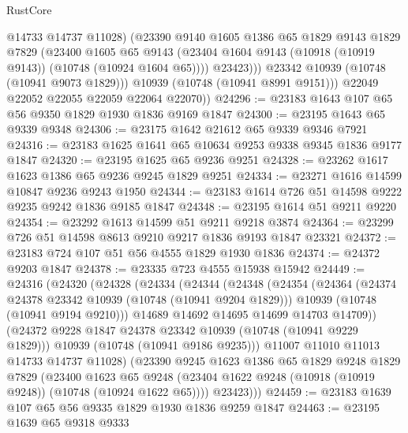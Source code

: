 \begin{lexlean}{RustCore}
\begin{coremodule}
                  @14733
                  @14737
                  @11028)
                (@23390
                  @9140
                  @1605
                  @1386
                  @65
                  @1829
                  @9143
                  @1829
                  @7829
                  (@23400
                    @1605
                    @65
                    @9143
                    (@23404 @1604 @9143 (@10918 (@10919 @9143)) (@10748 (@10924 @1604 @65))))
                  @23423)))
            @23342
            @10939
            (@10748 (@10941 @9073 @1829)))
          @10939
          (@10748 (@10941 @8991 @9151)))
        @22049
        @22052
        @22055
        @22059
        @22064
        @22070))
@24296 := @23183 @1643 @107 @65 @56 @9350 @1829 @1930 @1836 @9169 @1847
@24300 := @23195 @1643 @65 @9339 @9348
@24306 := @23175 @1642 @21612 @65 @9339 @9346 @7921
@24316 := @23183 @1625 @1641 @65 @10634 @9253 @9338 @9345 @1836 @9177 @1847
@24320 := @23195 @1625 @65 @9236 @9251
@24328 := @23262 @1617 @1623 @1386 @65 @9236 @9245 @1829 @9251
@24334 := @23271 @1616 @14599 @10847 @9236 @9243 @1950
@24344 := @23183 @1614 @726 @51 @14598 @9222 @9235 @9242 @1836 @9185 @1847
@24348 := @23195 @1614 @51 @9211 @9220
@24354 := @23292 @1613 @14599 @51 @9211 @9218 @3874
@24364 := @23299 @726 @51 @14598 @8613 @9210 @9217 @1836 @9193 @1847 @23321
@24372 := @23183 @724 @107 @51 @56 @4555 @1829 @1930 @1836
@24374 := @24372 @9203 @1847
@24378 := @23335 @723 @4555 @15938 @15942
@24449 := @24316
    (@24320
      (@24328
        (@24334
          (@24344
            (@24348
              (@24354
                (@24364
                  (@24374 @24378 @23342 @10939 (@10748 (@10941 @9204 @1829)))
                  @10939
                  (@10748 (@10941 @9194 @9210)))
                @14689
                @14692
                @14695
                @14699
                @14703
                @14709))
            (@24372 @9228 @1847 @24378 @23342 @10939 (@10748 (@10941 @9229 @1829)))
            @10939
            (@10748 (@10941 @9186 @9235)))
          @11007
          @11010
          @11013
          @14733
          @14737
          @11028)
        (@23390
          @9245
          @1623
          @1386
          @65
          @1829
          @9248
          @1829
          @7829
          (@23400
            @1623
            @65
            @9248
            (@23404 @1622 @9248 (@10918 (@10919 @9248)) (@10748 (@10924 @1622 @65))))
          @23423)))
@24459 := @23183 @1639 @107 @65 @56 @9335 @1829 @1930 @1836 @9259 @1847
@24463 := @23195 @1639 @65 @9318 @9333

\end{coremodule}
\end{lexlean}
